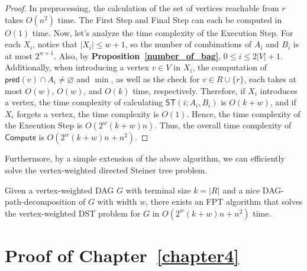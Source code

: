 \documentclass[runningheads]{llncs}
\theoremstyle{plain}
\theoremstyle{definition}
\begin{document}
\begin{proof}
    In preprocessing, the calculation of the set of vertices reachable from $r$ takes $O(n^2)$ time. The First Step and Final Step can each be computed in $O(1)$ time. Now, let’s analyze the time complexity of the Execution Step. For each $X_i$, notice that $|X_i| \leq w + 1$, so the number of combinations of $A_i$ and $B_i$ is at most $2^{w+1}$. Also, by \textbf{Proposition~\ref{number_of_bag}}, $0 \leq i \leq 2|V|+1$. Additionally, when introducing a vertex $v \in V$ in $X_i$, the computation of $\mathsf{pred}(v) \cap A_i \neq \varnothing$ and $\min$, as well as the check for $v \in R \cup \{r\}$, each takes at most $O(w)$, $O(w)$, and $O(k)$ time, respectively. Therefore, if $X_i$ introduces a vertex, the time complexity of calculating $\mathsf{ST}(i; A_i, B_i)$ is $O(k+w)$, and if $X_i$ forgets a vertex, the time complexity is $O(1)$. Hence, the time complexity of the Execution Step is $O(2^w(k+w)n)$. Thus, the overall time complexity of $\mathsf{Compute}$ is $O(2^w(k+w)n + n^2)$.
\end{proof}

Furthermore, by a simple extension of the above algorithm, we can efficiently solve the vertex-weighted directed Steiner tree problem.

\begin{theorem}
    Given a vertex-weighted DAG $G$ with terminal size $k = |R|$ and a nice DAG-path-decomposition of $G$ with width $w$, there exists an FPT algorithm that solves the vertex-weighted DST problem for $G$ in $O(2^w(k+w)n + n^2)$ time.
\end{theorem}





























\section{Proof of Chapter~\ref{chapter4}}
\end{document}
